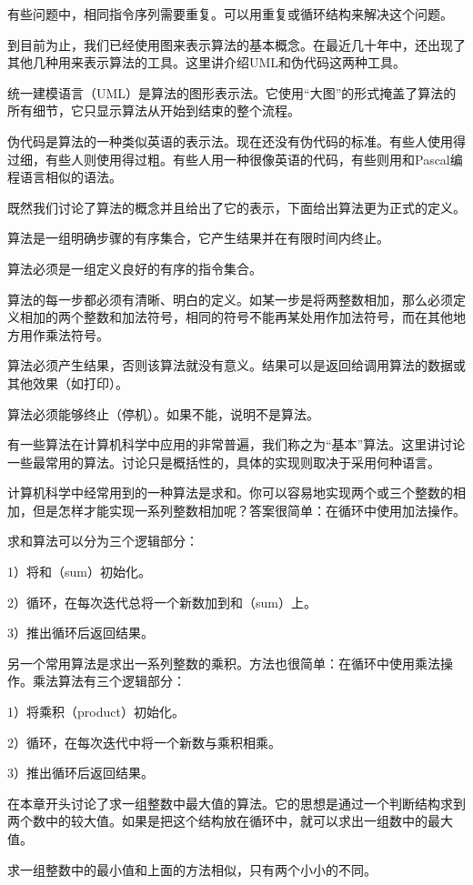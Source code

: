 有些问题中，相同指令序列需要重复。可以用重复或循环结构来解决这个问题。

到目前为止，我们已经使用图来表示算法的基本概念。在最近几十年中，还出现了其他几种用来表示算法的工具。这里讲介绍UML和伪代码这两种工具。

统一建模语言（UML）是算法的图形表示法。它使用“大图”的形式掩盖了算法的所有细节，它只显示算法从开始到结束的整个流程。

伪代码是算法的一种类似英语的表示法。现在还没有伪代码的标准。有些人使用得过细，有些人则使用得过粗。有些人用一种很像英语的代码，有些则用和Pascal编程语言相似的语法。

既然我们讨论了算法的概念并且给出了它的表示，下面给出算法更为正式的定义。

算法是一组明确步骤的有序集合，它产生结果并在有限时间内终止。

算法必须是一组定义良好的有序的指令集合。

算法的每一步都必须有清晰、明白的定义。如某一步是将两整数相加，那么必须定义相加的两个整数和加法符号，相同的符号不能再某处用作加法符号，而在其他地方用作乘法符号。

算法必须产生结果，否则该算法就没有意义。结果可以是返回给调用算法的数据或其他效果（如打印）。

算法必须能够终止（停机）。如果不能，说明不是算法。

有一些算法在计算机科学中应用的非常普遍，我们称之为“基本”算法。这里讲讨论一些最常用的算法。讨论只是概括性的，具体的实现则取决于采用何种语言。

计算机科学中经常用到的一种算法是求和。你可以容易地实现两个或三个整数的相加，但是怎样才能实现一系列整数相加呢？答案很简单：在循环中使用加法操作。

求和算法可以分为三个逻辑部分：

1）将和（sum）初始化。

2）循环，在每次迭代总将一个新数加到和（sum）上。

3）推出循环后返回结果。

另一个常用算法是求出一系列整数的乘积。方法也很简单：在循环中使用乘法操作。乘法算法有三个逻辑部分：

1）将乘积（product）初始化。

2）循环，在每次迭代中将一个新数与乘积相乘。

3）推出循环后返回结果。

在本章开头讨论了求一组整数中最大值的算法。它的思想是通过一个判断结构求到两个数中的较大值。如果是把这个结构放在循环中，就可以求出一组数中的最大值。

求一组整数中的最小值和上面的方法相似，只有两个小小的不同。

